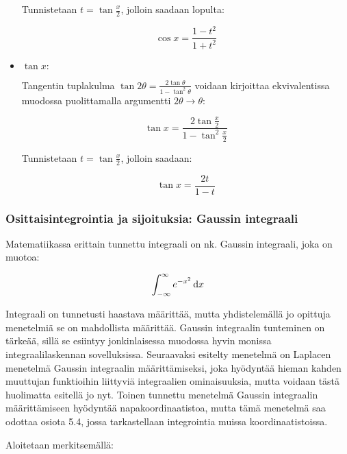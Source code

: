 \documentclass[../integrointiopas.tex]{subfiles}
\begin{document}
\begin{itemize}
		\noindent Tunnistetaan $t = \tan\frac{x}{2}$, jolloin saadaan lopulta:
		
		\begin{equation}
			\boxed{\cos x = \frac{1 - t^2}{1 + t^2}}
		\end{equation}
		
		\item \underline{$\tan x:$}
		
		Tangentin tuplakulma $\tan 2\theta = \frac{2\tan\theta}{1 - \tan^2\theta}$ voidaan kirjoittaa ekvivalentissa muodossa puolittamalla argumentti $2\theta\to\theta$:
		
		\begin{equation}
			\tan x = \frac{2\tan\frac{x}{2}}{1 - \tan^2\frac{x}{2}}
		\end{equation}
	
		\noindent Tunnistetaan $t = \tan\frac{x}{2}$, jolloin saadaan:
		
		\begin{equation}
			\boxed{\tan x = \frac{2t}{1 - t}}
		\end{equation}

	\end{itemize}

	\subsubsection{Osittaisintegrointia ja sijoituksia: Gaussin integraali}
	
	Matematiikassa erittain tunnettu integraali on nk. Gaussin integraali, joka on muotoa:
	
	\begin{equation}
		\int_{-\infty}^{\infty}e^{-x^2}\odif{x}
	\end{equation}

	Integraali on tunnetusti haastava määrittää, mutta yhdistelemällä jo opittuja menetelmiä se on mahdollista määrittää. Gaussin integraalin tunteminen on tärkeää, sillä se esiintyy jonkinlaisessa muodossa hyvin monissa integraalilaskennan sovelluksissa. Seuraavaksi esitelty menetelmä on Laplacen menetelmä Gaussin integraalin määrittämiseksi, joka hyödyntää hieman kahden muuttujan funktioihin liittyviä integraalien ominaisuuksia, mutta voidaan tästä huolimatta esitellä jo nyt. Toinen tunnettu menetelmä Gaussin integraalin määrittämiseen hyödyntää napakoordinaatistoa, mutta tämä menetelmä saa odottaa osiota 5.4, jossa tarkastellaan integrointia muissa koordinaatistoissa.
	
	Aloitetaan merkitsemällä:
	
\end{document}
